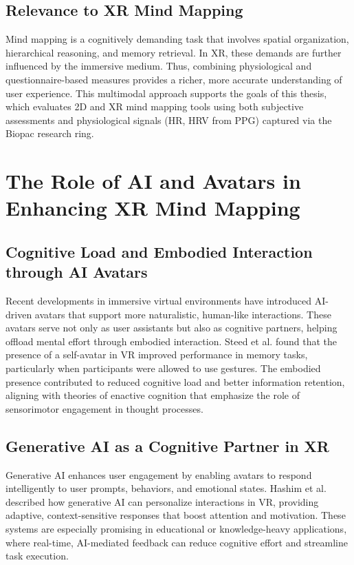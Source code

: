 \documentclass{CPP}
\begin{document}
\subsection{Relevance to XR Mind Mapping}

Mind mapping is a cognitively demanding task that involves spatial organization, hierarchical reasoning, and memory retrieval. In XR, these demands are further influenced by the immersive medium. Thus, combining physiological and questionnaire-based measures provides a richer, more accurate understanding of user experience. This multimodal approach supports the goals of this thesis, which evaluates 2D and XR mind mapping tools using both subjective assessments and physiological signals (HR, HRV from PPG) captured via the Biopac research ring.



\section{The Role of AI and Avatars in Enhancing XR Mind Mapping}

\subsection{Cognitive Load and Embodied Interaction through AI Avatars}

Recent developments in immersive virtual environments have introduced AI-driven avatars that support more naturalistic, human-like interactions. These avatars serve not only as user assistants but also as cognitive partners, helping offload mental effort through embodied interaction. Steed et al. \citep{Steed2016} found that the presence of a self-avatar in VR improved performance in memory tasks, particularly when participants were allowed to use gestures. The embodied presence contributed to reduced cognitive load and better information retention, aligning with theories of enactive cognition that emphasize the role of sensorimotor engagement in thought processes.

\subsection{Generative AI as a Cognitive Partner in XR}

Generative AI enhances user engagement by enabling avatars to respond intelligently to user prompts, behaviors, and emotional states. Hashim et al. \citep{Hashim2024} described how generative AI can personalize interactions in VR, providing adaptive, context-sensitive responses that boost attention and motivation. These systems are especially promising in educational or knowledge-heavy applications, where real-time, AI-mediated feedback can reduce cognitive effort and streamline task execution.
\end{document}
